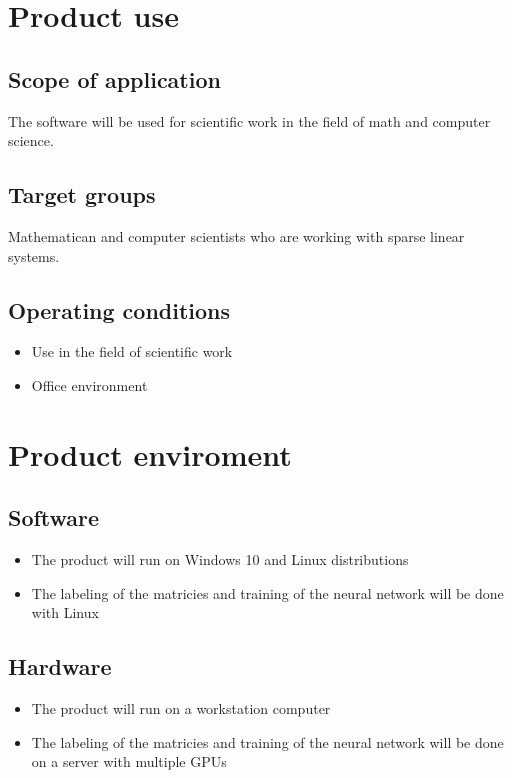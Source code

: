 \documentclass[parskip=full]{scrartcl}
\begin{document}
\section{Product use}
\subsection{Scope of application}
The software will be used for scientific work in the field of math and computer science.
\subsection{Target groups}
Mathematican and computer scientists who are working with sparse linear systems.
\subsection{Operating conditions}

\begin{itemize}
\item Use in the field of scientific work
\item Office environment
\end{itemize}

\section{Product enviroment}


\subsection{Software}

\begin{itemize}
\item The product will run on Windows 10 and Linux distributions 
\item The labeling of the matricies and training of the neural network will be done with Linux
\end{itemize}

\subsection{Hardware}

\begin{itemize}
\item The product will run on a workstation computer
\item The labeling of the matricies and training of the neural network will be done on a server with multiple GPUs
\end{itemize}
\end{document}
